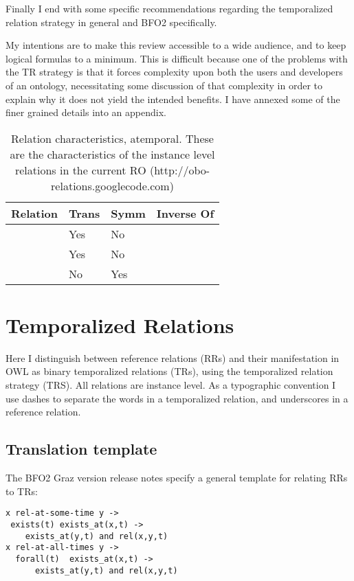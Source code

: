 \documentclass{bioinfo}
\def\partOf{\pr{part\_of}}
\def\hasPart{\pr{has\_part}}
\def\adjacentTo{\pr{adjacent\_to}}
\begin{document}
Finally I end with some specific recommendations regarding the
temporalized relation strategy in general and BFO2 specifically.

My intentions are to make this review accessible to a wide audience,
and to keep logical formulas to a minimum. This is difficult because
one of the problems with the TR strategy is that it forces complexity
upon both the users and developers of an ontology, necessitating some
discussion of that complexity in order to explain why it does not
yield the intended benefits. I have annexed some of the finer grained
details into an appendix.

\begin{table}
\begin{tabular}{ | p{2.5cm} | p{1cm} | p{1cm} | p{2.5cm} | }
\hline
\textbf{Relation} & \textbf{Trans} & \textbf{Symm} & \textbf{Inverse Of}  \\
\hline
\partOf\  & Yes & No & \hasPart  \\
\hline
\hasPart\ & Yes & No & \partOf \\
\hline
\adjacentTo\ & No & Yes &  \\
\hline
\end{tabular}
\caption{Relation characteristics, atemporal. These are the characteristics of the instance level relations in the current RO (http://obo-relations.googlecode.com)}
\label{tab:characteristics-atemporal}
\end{table}


\section{Temporalized Relations}

Here I distinguish between reference relations (RRs) and their
manifestation in OWL as binary temporalized relations (TRs), using the
temporalized relation strategy (TRS). All relations are instance
level. As a typographic convention I use dashes to separate the words
in a temporalized relation, and underscores in a reference relation.

\subsection{Translation template}

The BFO2 Graz version release notes\cite{Graz} specify a general
template for relating RRs to TRs:

\begin{verbatim}
x rel-at-some-time y ->
 exists(t) exists_at(x,t) -> 
    exists_at(y,t) and rel(x,y,t)
x rel-at-all-times y ->
  forall(t)  exists_at(x,t) -> 
      exists_at(y,t) and rel(x,y,t)
\end{verbatim}
\end{document}
